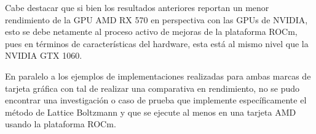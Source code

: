 Cabe destacar que si bien los resultados anteriores reportan un menor rendimiento de la GPU AMD RX 570 en perspectiva con las GPUs de NVIDIA, esto se debe netamente al proceso activo de mejoras de la plataforma ROCm, pues en términos de características del hardware, esta está al mismo nivel que la NVIDIA GTX 1060.

En paralelo a los ejemplos de implementaciones realizadas para ambas marcas de tarjeta gráfica con tal de realizar una comparativa en rendimiento, no se pudo encontrar una investigación o caso de prueba que implemente específicamente el método de Lattice Boltzmann y que se ejecute al menos en una tarjeta AMD usando la plataforma ROCm.



